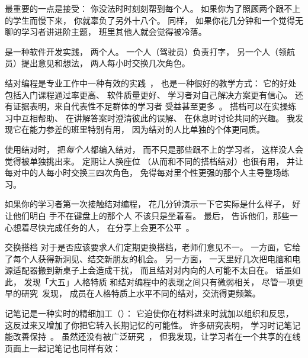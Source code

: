最重要的一点是接受：
你没法时时刻刻帮到每个人。
如果你为了照顾两个跟不上的学生而慢下来，
你就辜负了另外十八个。
同样，
如果你花几分钟和一个觉得无聊的学习者讲进阶主题，
班里其他人就会觉得被冷落。


是一种软件开发实践，
两个人。
一个人（驾驶员）负责打字，
另一个人（领航员）提出意见和想法，
两人每小时交换几次角色。

结对编程是专业工作中一种有效的实践~\cite{Hann2009}，
也是一种很好的教学方式：
它的好处包括入门课程通过率更高、
软件质量更好、
学习者对自己解决方案更有信心。
还有证据表明，来自代表性不足群体的学习者
受益甚至更多~\cite{McDo2006,Hank2011,Port2013,Cele2018}。
搭档可以在实操练习中互相帮助、
在讲解答案时澄清彼此的误解、
在休息时讨论共同的兴趣。
我发现它在能力参差的班里特别有用，
因为结对的人比单独的个体更同质。

使用结对时，
把\emph{每个人}都编入结对，
而不只是那些跟不上的学习者，
这样没人会觉得被单独挑出来。
定期让人换座位
（从而和不同的搭档结对）也很有用，
并让每对中的人每小时交换三四次角色，
免得每对里个性更强的那个人主导整场练习。

如果你的学习者第一次接触结对编程，
花几分钟演示一下它实际是什么样子，
好让他们明白
手不在键盘上的那个人
不该只是坐着看。
最后，
告诉他们，那些一心想着尽快完成任务的人，
在分享上会更不公平~\cite{Lewi2015}。

\begin{aside}{交换搭档}
  对于是否应该要求人们定期更换搭档，老师们意见不一。
  一方面，它给了每个人获得新洞见、结交新朋友的机会。
  另一方面，
  一天里好几次把电脑和电源适配器搬到新桌子上会造成干扰，
  而且结对对内向的人可能不太自在。
  话虽如此，
  \cite{Hann2010}发现「大五」人格特质
  和结对编程中的表现之间只有微弱相关，
  尽管一项更早的研究~\cite{Wall2009}发现，
  成员在人格特质上水平不同的结对，交流得更频繁。
\end{aside}


记笔记是一种实时的精细加工（）：
它迫使你在材料进来时就加以组织和反思，
这反过来又增加了你把它转入长期记忆的可能性。
许多研究表明，
学习时记笔记能改善保持~\cite{Aike1975,Boha2011}。
虽然还没有被广泛研究~\cite{Ornd2015,Yang2015}，
但我发现，让学习者在一个共享的在线页面上一起记笔记也同样有效：

